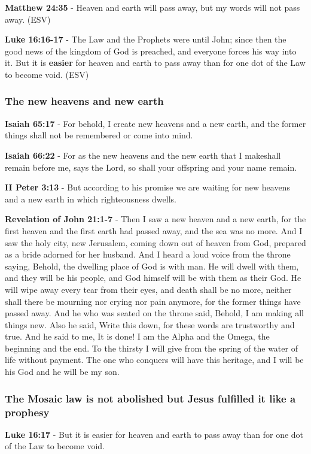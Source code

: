 \documentclass[11pt]{article}
\begin{document}
\textbf{Matthew 24:35} - Heaven and earth will pass away, but my words will not pass away. (ESV)

\textbf{Luke 16:16-17} -  The Law and the Prophets were until John; since then the good news of the kingdom of God is preached, and everyone forces his way into it.  But it is \textbf{easier} for heaven and earth to pass away than for one dot of the Law to become void. (ESV)

\subsubsection{The new heavens and new earth}
\label{sec:org85b2d20}
\textbf{Isaiah 65:17} - For behold, I create new heavens and a new earth, and the former things shall not be remembered or come into mind.

\textbf{Isaiah 66:22} - For as the new heavens and the new earth that I makeshall remain before me, says the Lord, so shall your offspring and your name remain.

\textbf{II Peter 3:13} - But according to his promise we are waiting for new heavens and a new earth in which righteousness dwells.

\textbf{Revelation of John 21:1-7} - Then I saw a new heaven and a new earth, for the first heaven and the first earth had passed away, and the sea was no more. And I saw the holy city, new Jerusalem, coming down out of heaven from God, prepared as a bride adorned for her husband. And I heard a loud voice from the throne saying, Behold, the dwelling place of God is with man. He will dwell with them, and they will be his people, and God himself will be with them as their God. He will wipe away every tear from their eyes, and death shall be no more, neither shall there be mourning nor crying nor pain anymore, for the former things have passed away. And he who was seated on the throne said, Behold, I am making all things new. Also he said, Write this down, for these words are trustworthy and true. And he said to me, It is done! I am the Alpha and the Omega, the beginning and the end. To the thirsty I will give from the spring of the water of life without payment. The one who conquers will have this heritage, and I will be his God and he will be my son.

\subsubsection{The Mosaic law is not abolished but Jesus fulfilled it like a prophesy}
\label{sec:org961eac1}
\textbf{Luke 16:17} - But it is easier for heaven and earth to pass away than for one dot of the Law to become void.
\end{document}
